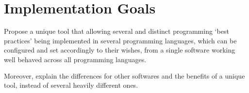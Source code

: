     \section{Implementation Goals}

    Propose a unique tool that allowing several and distinct
    programming `best practices' being implemented in several programming
    languages, which can be configured and set accordingly to their wishes,
    from a single software working well behaved across all programming languages.

    Moreover, explain the differences for other softwares and the benefits
    of a unique tool, instead of several heavily different ones.











